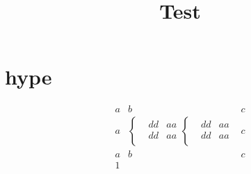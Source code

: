 \documentclass{book}
\title{
  Test
}
\begin{document}
\maketitle

\part{hype}
\begin{align}
  a & b & c \\ %
  a &  \begin{cases}
       & dd & aa \\
       & dd & aa \\  %
      \end{cases}

      \begin{cases}
       & dd & aa \\
       & dd & aa \\
      \end{cases} & c \\
  a & b & c \\ 1 \\

\end{align}
\end{document}
